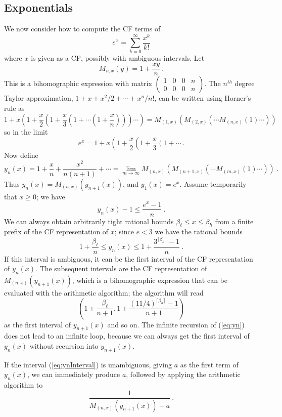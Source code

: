 \documentclass[11pt, oneside]{amsart}   	%
\newcommand{\bihomographic}[8]{\left(\begin{smallmatrix}#1&#2&#3&#4\\#5&#6&#7&#8\end{smallmatrix}\right)}
\renewcommand{\:}{\negthickspace:\negthickspace}
\begin{document}
\subsection{Exponentials} We now consider how to compute the CF terms of 
\[
e^x = \sum_{k=0}^{\infty} \frac{x^k}{k!}
\]
where $x$ is given as a CF, possibly with ambiguous intervals. Let
\[
M_{n,x}(y) = 1 + \frac{xy}{n} \ .
\]
This is a bihomographic expression with matrix $\bihomographic{1}{0}{0}{n}{0}{0}{0}{n}$. The $n^{th}$ degree Taylor approximation,
$1 + x + x^2/2 +\cdots + x^n/{n!}$, can be written using Horner's rule as
\[
 1 + x \left(1 + \frac{x}{2}\left( 1 + \frac{x}{3}\left(1 + \cdots \left(1 + \frac{x}{n}\right)\right)\right) \cdots \right) = M_{(1,x)}( M_{(2,x)}( \cdots M_{(n,x)}(1) \cdots ) )
 \]
 so in the limit
 \begin{equation}\label{eq:spigot}
 e^x = 1 + x \left(1 + \frac{x}{2}\left( 1 + \frac{x}{3}\left(1 + \cdots \right. \right.  \right.   \ .
 \end{equation} 
 Now define
 \begin{equation}\label{eq:yn}
 y_n(x) = 1 + \frac{x}{n} + \frac{x^2}{n(n+1)} + \cdots = \lim_{m\to\infty} M_{(n,x)}( M_{(n+1,x)}( \cdots M_{(m,x)}(1) \cdots ) ) \ .
  \end{equation}
Thus $y_n(x) = M_{(n,x)}(y_{n+1}(x))$, and $y_1(x) = e^x$.
Assume temporarily that $x \geq 0$; we have
 \[
 y_n(x) - 1 \leq \frac{e^x - 1}{n} \ .
 \]
  We can always obtain arbitrarily tight rational bounds $\beta_{\ell} \leq x \leq \beta_{h}$ from a finite prefix of the CF representation of $x$; since $e < 3$  we have the rational bounds
 \begin{equation}\label{eq:ynInterval}
  1+\frac{\beta_{\ell}}{n} \leq y_n(x) \leq  1 + \frac{3^{\lceil\beta_{h}\rceil}-1}{n} \ .
 \end{equation}
 If this interval is ambiguous, it can be the first interval of the CF representation of $y_n(x)$.
The subsequent intervals are the CF representation of $M_{(n,x)}(y_{n+1}(x))$,
which is a bihomographic expression that can be evaluated with the arithmetic algorithm;
the algorithm will read
\[
\left(1+\frac{\beta_{\ell}}{n+1} , 1 + \frac{(11/4)^{\lceil\beta_{h}\rceil}-1}{n+1}\right)
\]
as the first interval of $y_{n+1}(x)$ and so on. The infinite recursion of (\ref{eq:yn}) does not lead to an infinite loop, because we can always get the first interval of $y_n(x)$ without recursion into $y_{n+1}(x)$.

If the interval (\ref{eq:ynInterval}) is unambiguous, giving $a$ as the first term of $y_n(x)$, we can immediately produce $a$, followed by applying the arithmetic algorithm to
\[
\frac{1}{M_{(n,x)}(y_{n+1}(x)) - a} \ .
\]
\end{document}

